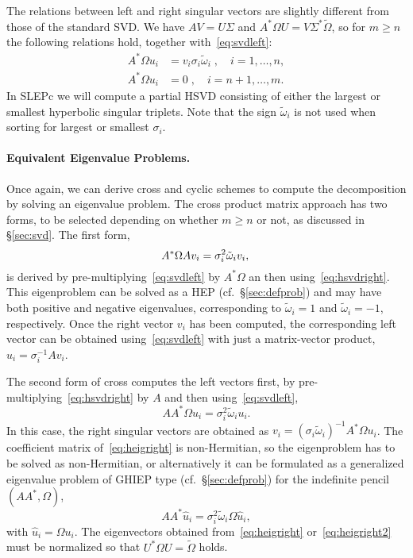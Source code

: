 The relations between left and right singular vectors are slightly different from those of the standard SVD. We have $AV=U\Sigma$ and $A^*\Omega U=V\Sigma^*\tilde\Omega$, so for $m\geq n$ the following relations hold, together with~\eqref{eq:svdleft}:
\begin{align}
\label{eq:hsvdright}
A^*\Omega u_i&=v_i\sigma_i\tilde\omega_i\;,\quad i=1,\ldots,n,\\
\label{eq:hsvdright2}
A^*\Omega u_i&=0\;,\quad i=n+1,\ldots,m.
\end{align}
In SLEPc we will compute a partial HSVD consisting of either the largest or smallest hyperbolic singular triplets. Note that the sign $\tilde\omega_i$ is not used when sorting for largest or smallest $\sigma_i$.

\paragraph{Equivalent Eigenvalue Problems.}
Once again, we can derive cross and cyclic schemes to compute the decomposition by solving an eigenvalue problem. The cross product matrix approach has two forms, to be selected depending on whether $m\geq n$ or not, as discussed in \S\ref{sec:svd}. The first form,
\begin{equation}
\label{eq:heigleft}
A^*\Omega Av_i=\sigma_i^2\tilde\omega_iv_i,\\
\end{equation}
is derived by pre-multiplying~\eqref{eq:svdleft} by $A^*\Omega$ an then using~\eqref{eq:hsvdright}. This eigenproblem can be solved as a HEP (cf.~\S\ref{sec:defprob}) and may have both positive and negative eigenvalues, corresponding to $\tilde\omega_i=1$ and $\tilde\omega_i=-1$, respectively. Once the right vector $v_i$ has been computed, the corresponding left vector can be obtained using~\eqref{eq:svdleft} with just a matrix-vector product, $u_i=\sigma_i^{-1}Av_i$.

The second form of cross computes the left vectors first, by pre-multiplying~\eqref{eq:hsvdright} by $A$ and then using~\eqref{eq:svdleft},
\begin{equation}
\label{eq:heigright}
AA^*\Omega u_i=\sigma_i^2\tilde\omega_iu_i.
\end{equation}
In this case, the right singular vectors are obtained as $v_i=(\sigma_i\tilde\omega_i)^{-1}A^*\Omega u_i$. The coefficient matrix of~\eqref{eq:heigright} is non-Hermitian, so the eigenproblem has to be solved as non-Hermitian, or alternatively it can be formulated as a generalized eigenvalue problem of GHIEP type (cf.~\S\ref{sec:defprob}) for the indefinite pencil $(AA^*,\Omega)$,
\begin{equation}
\label{eq:heigright2}
AA^*\hat{u}_i=\sigma_i^2\tilde\omega_i\Omega \hat{u}_i,
\end{equation}
with $\hat{u}_i=\Omega u_i$. The eigenvectors obtained from~\eqref{eq:heigright} or~\eqref{eq:heigright2} must be normalized so that $U^*\Omega U=\tilde\Omega$ holds.

